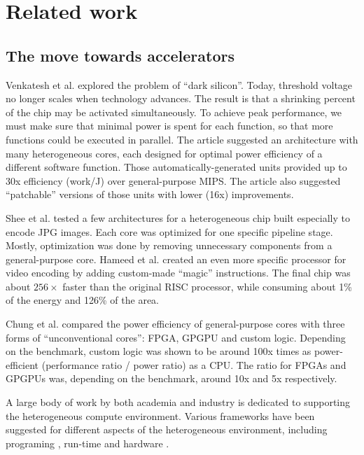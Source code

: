 \documentclass[twocolumn,english]{IEEEtran}
\begin{document}
\section{Related work}


\subsection*{The move towards accelerators}

Venkatesh et al. \cite{ConservationC} explored the problem of {}``dark
silicon''. Today, threshold voltage no longer scales when technology
advances. The result is that a shrinking percent of the chip may be
activated simultaneously. To achieve peak performance, we must make
sure that minimal power is spent for each function, so that more functions
could be executed in parallel. The article suggested an architecture
with many heterogeneous cores, each designed for optimal power efficiency
of a different software function. Those automatically-generated units
provided up to 30x efficiency (work/J) over general-purpose MIPS.
The article also suggested {}``patchable'' versions of those units
with lower (16x) improvements.

Shee et al. \cite{Shee08} tested a few architectures for a heterogeneous
chip built especially to encode JPG images. Each core was optimized
for one specific pipeline stage. Mostly, optimization was done by
removing unnecessary components from a general-purpose core. Hameed
et al. \cite{Understanding-1} created an even more specific processor
for video encoding by adding custom-made {}``magic'' instructions.
The final chip was about $256\times$ faster than the original RISC
processor, while consuming about 1\% of the energy and 126\% of the
area.

Chung et al. \cite{Single-ChipHe} compared the power efficiency of
general-purpose cores with three forms of {}``unconventional cores'':
FPGA, GPGPU and custom logic. Depending on the benchmark, custom logic
was shown to be around 100x times as power-efficient (performance
ratio / power ratio) as a CPU. The ratio for FPGAs and GPGPUs was,
depending on the benchmark, around 10x and 5x respectively.

A large body of work by both academia and industry is dedicated to
supporting the heterogeneous compute environment. Various frameworks
have been suggested for different aspects of the heterogeneous environment,
including programing \cite{OpenCL-slides}, run-time \cite{StarPU:Aunif}
and hardware \cite{AcceleratorStore}. 
\end{document}

